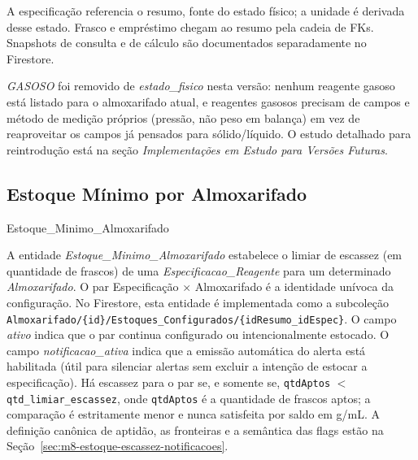 \begin{explicacao}
A especificação referencia o resumo, fonte do estado físico; a unidade é derivada desse estado. Frasco e empréstimo chegam ao resumo pela cadeia de FKs. Snapshots de consulta e de cálculo são documentados separadamente no Firestore.

\textit{GASOSO} foi removido de \textit{estado\_fisico} nesta versão: nenhum reagente gasoso está listado para o almoxarifado atual, e reagentes gasosos precisam de campos e método de medição próprios (pressão, não peso em balança) em vez de reaproveitar os campos já pensados para sólido/líquido. O estudo detalhado para reintrodução está na seção \textit{Implementações em Estudo para Versões Futuras}.
\end{explicacao}

\subsection{Estoque Mínimo por Almoxarifado}
\begin{entidade}{Estoque\_Minimo\_Almoxarifado}
\end{entidade}

\begin{explicacao}
A entidade \textit{Estoque\_Minimo\_Almoxarifado} estabelece o limiar de escassez (em quantidade de frascos) de uma \textit{Especificacao\_Reagente} para um determinado \textit{Almoxarifado}. O par Especificação × Almoxarifado é a identidade unívoca da configuração. No Firestore, esta entidade é implementada como a subcoleção \texttt{Almoxarifado/\{id\}/Estoques\_Configurados/\{idResumo\_idEspec\}}.
O campo \textit{ativo} indica que o par continua configurado ou intencionalmente estocado. 
O campo \textit{notificacao\_ativa} indica que a emissão automática do alerta está habilitada (útil para silenciar alertas sem excluir a intenção de estocar a especificação).
Há escassez para o par se, e somente se, \texttt{qtdAptos} $<$ \texttt{qtd\_limiar\_escassez}, onde \texttt{qtdAptos} é a quantidade de frascos aptos; a comparação é estritamente menor e nunca satisfeita por saldo em g/mL. A definição canônica de aptidão, as fronteiras e a semântica das flags estão na Seção~\ref{sec:m8-estoque-escassez-notificacoes}.
\end{explicacao}

